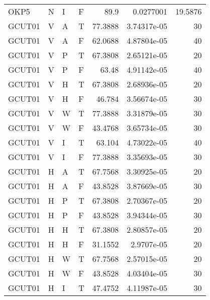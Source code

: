 \begin{longtable}{llllrrr}
    OKP5     & N         & I         & F          & 89.9       & 0.0277001   & 19.5876  \\
    GCUT01   & V         & A         & T          & 77.3888    & 3.74317e-05 & 30       \\
    GCUT01   & V         & A         & F          & 62.0688    & 4.87804e-05 & 40       \\
    GCUT01   & V         & P         & T          & 67.3808    & 2.65121e-05 & 20       \\
    GCUT01   & V         & P         & F          & 63.48      & 4.91142e-05 & 40       \\
    GCUT01   & V         & H         & T          & 67.3808    & 2.68936e-05 & 20       \\
    GCUT01   & V         & H         & F          & 46.784     & 3.56674e-05 & 30       \\
    GCUT01   & V         & W         & T          & 77.3888    & 3.31879e-05 & 30       \\
    GCUT01   & V         & W         & F          & 43.4768    & 3.65734e-05 & 30       \\
    GCUT01   & V         & I         & T          & 63.104     & 4.73022e-05 & 40       \\
    GCUT01   & V         & I         & F          & 77.3888    & 3.35693e-05 & 30       \\
    GCUT01   & H         & A         & T          & 67.7568    & 3.30925e-05 & 20       \\
    GCUT01   & H         & A         & F          & 43.8528    & 3.87669e-05 & 30       \\
    GCUT01   & H         & P         & T          & 67.3808    & 2.70367e-05 & 20       \\
    GCUT01   & H         & P         & F          & 43.8528    & 3.94344e-05 & 30       \\
    GCUT01   & H         & H         & T          & 67.3808    & 2.80857e-05 & 20       \\
    GCUT01   & H         & H         & F          & 31.1552    & 2.9707e-05  & 20       \\
    GCUT01   & H         & W         & T          & 67.7568    & 2.57015e-05 & 20       \\
    GCUT01   & H         & W         & F          & 43.8528    & 4.03404e-05 & 30       \\
    GCUT01   & H         & I         & T          & 47.4752    & 4.11987e-05 & 30       \\

\end{longtable}
